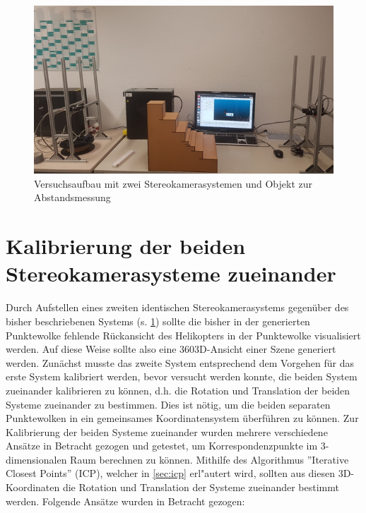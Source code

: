 \begin{figure}[H]
	\includegraphics[scale=1.0]{bilder/abstandsmessung}
	\caption[Versuchsaufbau mit zwei Stereokamerasystemen und Objekt zur Abstandsmessung]{Versuchsaufbau mit zwei Stereokamerasystemen und Objekt zur Abstandsmessung}
	\label{fig:abstandsmessung}
\end{figure}

\section{Kalibrierung der beiden Stereokamerasysteme zueinander}
\label{sec:kalibbeide}

Durch Aufstellen eines zweiten identischen Stereokamerasystems gegenüber des bisher beschriebenen Systems (s. \ref{fig:abstandsmessung}) sollte die bisher in der generierten Punktewolke fehlende Rückansicht des Helikopters in der Punktewolke visualisiert werden. Auf diese Weise sollte also eine 360\degree \space 3D-Ansicht einer Szene generiert werden. Zunächst musste das zweite System entsprechend dem Vorgehen für das erste System kalibriert werden, bevor versucht werden konnte, die beiden System zueinander kalibrieren zu können, d.h. die Rotation und Translation der beiden Systeme zueinander zu bestimmen. Dies ist nötig, um die beiden separaten Punktewolken in ein gemeinsames Koordinatensystem überführen zu können.\newline
\noindent Zur Kalibrierung der beiden Systeme zueinander wurden mehrere verschiedene Ansätze in Betracht gezogen und getestet, um Korrespondenzpunkte im 3-dimensionalen Raum berechnen zu können. Mithilfe des Algorithmus ''Iterative Closest Points'' (ICP), welcher in \ref{sec:icp} erl"autert wird, sollten aus diesen 3D-Koordinaten die Rotation und Translation der Systeme zueinander bestimmt werden.\newline
\noindent Folgende Ansätze wurden in Betracht gezogen:

